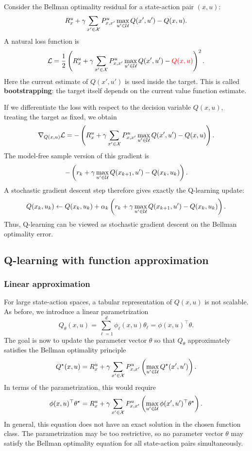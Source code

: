 Consider the Bellman optimality residual for a state-action pair \((x,u)\):
\[
R_x^u
+
\gamma\sum_{x'\in\mathcal{X}}P^u_{x,x'}
\max_{u'\in\mathcal{U}}Q(x',u')
-
Q(x,u).
\]
A natural loss function is
\[
\mathcal{L}
=
\frac{1}{2}
\left(
R_x^u
+
\gamma\sum_{x'\in\mathcal{X}}P^u_{x,x'}
\max_{u'\in\mathcal{U}}Q(x',u')
-
\textcolor{red}{Q(x,u)}
\right)^2.
\]
Here the current estimate of \(Q(x',u')\) is used inside the target. This is called
\textbf{bootstrapping}: the target itself depends on the current value function estimate.

If we differentiate the loss with respect to the decision variable \(Q(x,u)\), treating the target
as fixed, we obtain
\[
\nabla_{Q(x,u)}\mathcal{L}
=
-
\left(
R_x^u
+
\gamma\sum_{x'\in\mathcal{X}}P^u_{x,x'}
\max_{u'\in\mathcal{U}}Q(x',u')
-
Q(x,u)
\right).
\]
The model-free sample version of this gradient is
\[
-
\left(
r_k
+
\gamma\max_{u'\in\mathcal{U}}Q(x_{k+1},u')
-
Q(x_k,u_k)
\right).
\]
A stochastic gradient descent step therefore gives exactly the Q-learning update:
\[
Q(x_k,u_k)
\leftarrow
Q(x_k,u_k)
+
\alpha_k
\left(
r_k
+
\gamma\max_{u'\in\mathcal{U}}Q(x_{k+1},u')
-
Q(x_k,u_k)
\right).
\]
Thus, Q-learning can be viewed as stochastic gradient descent on the Bellman optimality error.

\subsection{Q-learning with function approximation}

\subsubsection{Linear approximation}

For large state-action spaces, a tabular representation of \(Q(x,u)\) is not scalable. As before,
we introduce a linear parametrization
\[
Q_\theta(x,u)
=
\sum_{\ell=1}^{d}\phi_\ell(x,u)\theta_\ell
=
\phi(x,u)^\top\theta.
\]
The goal is now to update the parameter vector \(\theta\) so that \(Q_\theta\) approximately
satisfies the Bellman optimality principle
\[
Q^\star(x,u)
=
R_x^u
+
\gamma\sum_{x'\in\mathcal{X}}P^u_{x,x'}
\left(
\max_{u'\in\mathcal{U}}Q^\star(x',u')
\right).
\]
In terms of the parametrization, this would require
\[
\phi(x,u)^\top\theta^\star
=
R_x^u
+
\gamma\sum_{x'\in\mathcal{X}}P^u_{x,x'}
\left(
\max_{u'\in\mathcal{U}}\phi(x',u')^\top\theta^\star
\right).
\]
In general, this equation does not have an exact solution in the chosen function class. The
parametrization may be too restrictive, so no parameter vector \(\theta\) may satisfy the
Bellman optimality equation for all state-action pairs simultaneously.

